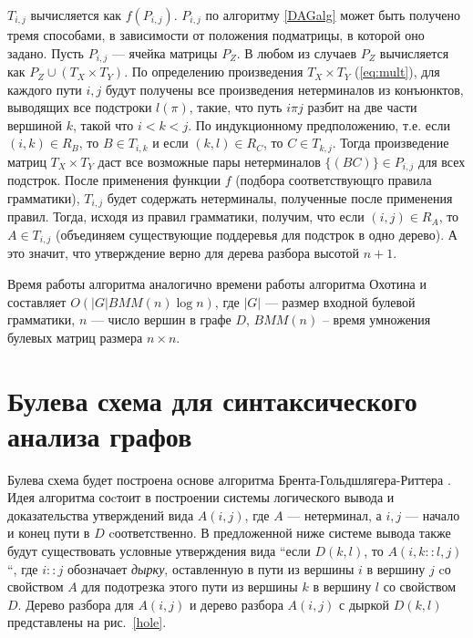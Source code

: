 $T_{i,j}$
вычисляется как $f(P_{i,j})$. $P_{i,j}$ по алгоритму \ref{DAGalg} может быть получено
тремя способами, в зависимости от положения подматрицы, в
которой оно задано. Пусть $P_{i,j}$ --- ячейка матрицы $P_Z$. В любом из
случаев  $P_Z$ вычисляется как $P_Z \cup (T_X \times T_Y)$. По определению
произведения $T_X \times T_Y$ (\ref{eq:mult}), для каждого пути $i, j$ будут получены все
произведения нетерминалов из конъюнктов, выводящих все
подстроки $l(\pi)$, такие, что путь $i \pi j$ разбит на две части вершиной
$k$, такой что $i < k < j$. По индукционному предположению,  т.е. если $(i,k) \in R_B$, то  $B \in T_{i,k}$ и если $(k,l) \in R_C$, то $C \in T_{k, j}$. Тогда
произведение матриц $T_X \times T_Y$ даст все возможные пары нетерминалов $\{(BC)\} \in P_{i,j}$ для всех подстрок. После применения функции $f$ (подбора соответствующго правила грамматики),  $T_{i,j}$ будет содержать нетерминалы, полученные после применения правил. Тогда, исходя из правил грамматики, получим, что если $(i,j) \in R_A$, то $A \in T_{i, j}$ (объединяем существующие поддеревья для подстрок в одно дерево).  А это значит, что утверждение верно для дерева разбора высотой $n + 1$.

Время работы алгоритма аналогично времени работы алгоритма
Охотина \cite{OkhotinParse} и составляет $O(|G|BMM(n) \log n)$, где $|G|$ --- размер
входной булевой грамматики, $n$ --- число вершин в графе $D$,
$BMM(n)$ – время умножения булевых матриц размера $n \times n$.



\section {Булева схема для синтаксического анализа графов}

Булева схема будет построена основе алгоритма Брента-Гольдшлягера-Риттера \cite{Brent}. Идея алгоритма соcтоит в построении системы логического вывода и доказательства утверждений вида $A(i, j)$, где $A$ --- нетерминал, а $i, j$ --- начало и конец пути в $D$ cоответственно. В предложенной ниже системе вывода также будут существовать условные утверждения вида ``если $D(k, l)$, то $A(i, k::l, j)$``, где $i::j$ обозначает \textit{дырку}, оставленную в пути из вершины $i$ в вершину $j$ cо свойством $A$ для подотрезка этого пути из вершины $k$ в вершину $l$ со свойством $D$. Дерево разбора для $A(i, j)$ и дерево разбора $A(i, j)$ с дыркой $D(k, l)$ представлены на рис.~\ref{hole}.


